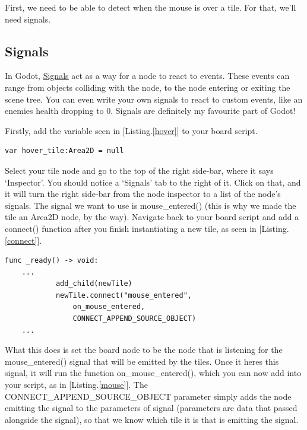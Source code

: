 \documentclass[14pt]{extarticle}
\newcommand{\prettyref}[2]{[{#1}.\ref{#2}]}
\begin{document}
First, we need to be able to detect when the mouse is over a tile. For that, we'll need signals.

\subsection*{Signals}
In Godot, \href{https://docs.godotengine.org/en/stable/classes/class_signal.html}{\underline{Signals}} act as a way for a node to react to events. These events can range from objects colliding with the node, to the node entering or exiting the scene tree. You can even write your own signals to react to custom events, like an enemies health dropping to 0. Signals are definitely my favourite part of Godot!

Firstly, add the variable seen in \prettyref{Listing}{hover} to your board script.

\begin{lstlisting}[language=gdscript, label={hover}, caption=New variable]
var hover_tile:Area2D = null
\end{lstlisting}

Select your tile node and go to the top of the right side-bar, where it says `Inspector'. You should notice a `Signals' tab to the right of it. Click on that, and it will turn the right side-bar from the node inspector to a list of the node's signals. The signal we want to use is mouse\_entered() (this is why we made the tile an Area2D node, by the way). Navigate back to your board script and add a connect() function after you finish instantiating a new tile, as seen in \prettyref{Listing}{connect}.

\begin{lstlisting}[language=gdscript, label={connect}, caption=Connecting the Signal]
func _ready() -> void:
	...
			add_child(newTile)
			newTile.connect("mouse_entered",
                on_mouse_entered,
                CONNECT_APPEND_SOURCE_OBJECT)
    ...
\end{lstlisting}

What this does is set the board node to be the node that is listening for the mouse\_entered() signal that will be emitted by the tiles. Once it heres this signal, it will run the function on\_mouse\_entered(), which you can now add into your script, as in \prettyref{Listing}{mouse}. The CONNECT\_APPEND\_SOURCE\_OBJECT parameter simply adds the node emitting the signal to the parameters of signal (parameters are data that passed alongside the signal), so that we know which tile it is that is emitting the signal.
\end{document}
